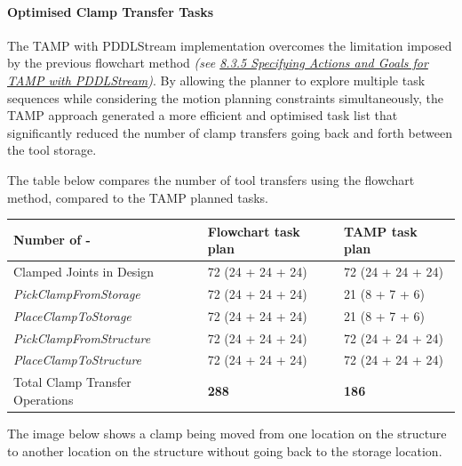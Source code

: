 \documentclass[11pt]{book}
\begin{document}
\paragraph{Optimised Clamp Transfer Tasks}

The TAMP with PDDLStream implementation overcomes the limitation imposed by the previous flowchart method \textit{(see \uline{8.3.5 Specifying Actions and Goals for TAMP with PDDLStream})}. By allowing the planner to explore multiple task sequences while considering the motion planning constraints simultaneously, the TAMP approach generated a more efficient and optimised task list that significantly reduced the number of clamp transfers going back and forth between the tool storage. 

The table below compares the number of tool transfers using the flowchart method, compared to the TAMP planned tasks.

\begin{table}[H]
\begin{adjustbox}{max width=\textwidth}
\begin{tabular}{p{5.29cm}p{5.25cm}p{5.33cm}}
\hline
\multicolumn{1}{|p{5.29cm}}{{\footnotesize \textbf{Number of - }}} & 
\multicolumn{1}{|p{5.25cm}}{{\footnotesize \textbf{Flowchart task plan}}} & 
\multicolumn{1}{|p{5.33cm}|}{{\footnotesize \textbf{TAMP task plan }}} \\ 
\hline
\multicolumn{1}{|p{5.29cm}}{{\footnotesize Clamped Joints in Design}} & 
\multicolumn{1}{|p{5.25cm}}{{\footnotesize 72 (24 + 24 + 24)}} & 
\multicolumn{1}{|p{5.33cm}|}{{\footnotesize 72 (24 + 24 + 24)}} \\ 
\hline
\multicolumn{1}{|p{5.29cm}}{{\footnotesize \textit{PickClampFromStorage}}} & 
\multicolumn{1}{|p{5.25cm}}{{\footnotesize 72 (24 + 24 + 24)}} & 
\multicolumn{1}{|p{5.33cm}|}{{\footnotesize 21 (8 + 7 + 6)}} \\ 
\hline
\multicolumn{1}{|p{5.29cm}}{{\footnotesize \textit{PlaceClampToStorage}}} & 
\multicolumn{1}{|p{5.25cm}}{{\footnotesize 72 (24 + 24 + 24)}} & 
\multicolumn{1}{|p{5.33cm}|}{{\footnotesize 21 (8 + 7  + 6)}} \\ 
\hline
\multicolumn{1}{|p{5.29cm}}{{\footnotesize \textit{PickClampFromStructure}}} & 
\multicolumn{1}{|p{5.25cm}}{{\footnotesize 72 (24 + 24 + 24)}} & 
\multicolumn{1}{|p{5.33cm}|}{{\footnotesize 72 (24 + 24 + 24)}} \\ 
\hline
\multicolumn{1}{|p{5.29cm}}{{\footnotesize \textit{PlaceClampToStructure}}} & 
\multicolumn{1}{|p{5.25cm}}{{\footnotesize 72 (24 + 24 + 24)}} & 
\multicolumn{1}{|p{5.33cm}|}{{\footnotesize 72 (24 + 24 + 24)}} \\ 
\hline
\multicolumn{1}{|p{5.29cm}}{{\footnotesize Total Clamp Transfer Operations}} & 
\multicolumn{1}{|p{5.25cm}}{{\footnotesize \textbf{288}}} & 
\multicolumn{1}{|p{5.33cm}|}{{\footnotesize \textbf{186}}} \\ 
\hline
\end{tabular}
\end{adjustbox}
\end{table}
The image below shows a clamp being moved from one location on the structure to another location on the structure without going back to the storage location.
\end{document}
